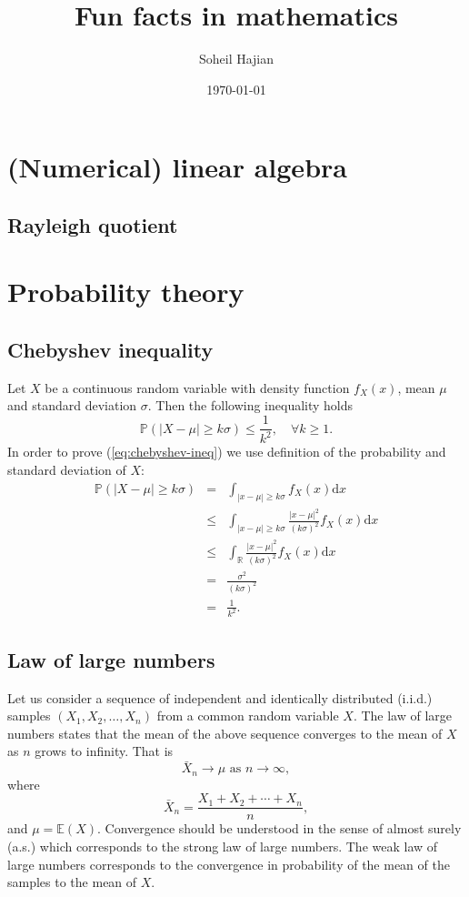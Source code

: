 \documentclass[11pt]{article}
\title{Fun facts in mathematics}
\author{Soheil Hajian}
\date{\today}
\newcommand{\R}{\mathbb{R}}
\newcommand{\Pro}{\mathbb{P}}
\newcommand{\dx}{\text{d}x}
\begin{document}
\maketitle	
\tableofcontents
\pagebreak

\section{(Numerical) linear algebra}
\subsection{Rayleigh quotient} \label{sec:rayleigh}
\section{Probability theory}
\subsection{Chebyshev inequality}
Let $X$ be a continuous random variable with density function
$f_X(x)$, mean $\mu$ and standard deviation $\sigma$. Then the
following inequality holds
\begin{equation} \label{eq:chebyshev-ineq}
  \Pro(|X-\mu| \geq k \sigma) \leq \frac{1}{k^2}, \quad \forall k \geq
  1.
\end{equation}
In order to prove (\ref{eq:chebyshev-ineq}) we use definition of
the probability and standard deviation of $X$:
\begin{equation}
  \begin{array}{rcl}
    \Pro(|X-\mu| \geq k \sigma) &=& \int_{|x-\mu|\geq k\sigma} f_X(x)
    \dx
    \\
    &\leq& \int_{|x-\mu|\geq k\sigma} \frac{|x-\mu|^2}{(k\sigma)^2}
    f_X(x) \dx
    \\
    &\leq& \int_{\R} \frac{|x-\mu|^2}{(k\sigma)^2}
    f_X(x) \dx
    \\
    &=& \frac{\sigma^2}{(k\sigma)^2}
    \\ &=& \frac{1}{k^2}.
  \end{array}
\end{equation}
%
\subsection{Law of large numbers}
Let us consider a sequence of independent and identically distributed
(i.i.d.) samples $(X_1, X_2, \dots, X_n)$ from a common random
variable $X$. The law of large numbers states that the mean of the
above sequence converges to the mean of $X$ as $n$ grows to
infinity. That is
\begin{equation}
  \bar{X}_n \rightarrow \mu \text{ as }
  n \rightarrow \infty,
\end{equation}
where
\begin{equation}
  \bar{X}_n = \frac{X_1 + X_2 + \cdots + X_n}{n},
\end{equation}
and $\mu = \mathbb{E}(X)$. Convergence should be understood in the
sense of almost surely (a.s.) which corresponds to the strong law of
large numbers. The weak law of large numbers corresponds to the
convergence in probability of the mean of the samples to the mean of
$X$.
\end{document}
